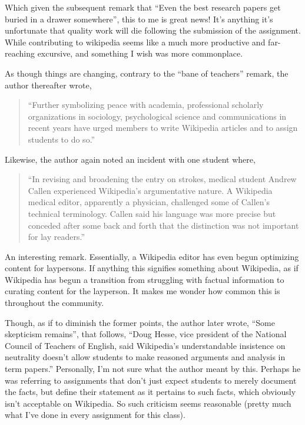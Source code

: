 Which given the subsequent remark that “Even the best research papers get buried in a drawer somewhere”, this to me is great news! It’s anything it’s unfortunate that quality work will die following the submission of the assignment. While contributing to wikipedia seems like a much more productive and far-reaching excursive, and something I wish was more commonplace.

As though things are changing, contrary to the “bane of teachers” remark, the author thereafter wrote,
\begin{quotation}
``Further symbolizing peace with academia, professional scholarly organizations in sociology, psychological science and communications in recent years have urged members to write Wikipedia articles and to assign students to do so.''
\end{quotation}

Likewise, the author again noted an incident with one student where,

\begin{quotation}
``In revising and broadening the entry on strokes, medical student Andrew Callen experienced Wikipedia’s argumentative nature. A Wikipedia medical editor, apparently a physician, challenged some of Callen’s technical terminology.  Callen said his language was more precise but conceded after some back and forth that the distinction was not important for lay readers.''
\end{quotation}

An interesting remark. Essentially, a Wikipedia editor has even begun optimizing content for laypersons. If anything this signifies something about Wikipedia, as if Wikipedia has begun a transition from struggling with factual information to curating content for the layperson. It makes me wonder how common this is throughout the community. 

Though, as if to diminish the former points, the author later wrote, “Some skepticism remains”, that follows, “Doug Hesse, vice president of the National Council of Teachers of English, said Wikipedia’s understandable insistence on neutrality doesn’t allow students to make reasoned arguments and analysis in term papers.” Personally, I’m not sure what the author meant by this. Perhaps he was referring to assignments that don’t just expect students to merely document the facts, but define their statement as it pertains to such facts, which obviously isn’t acceptable on Wikipedia. So such criticism seems reasonable (pretty much what I’ve done in every assignment for this class). 

